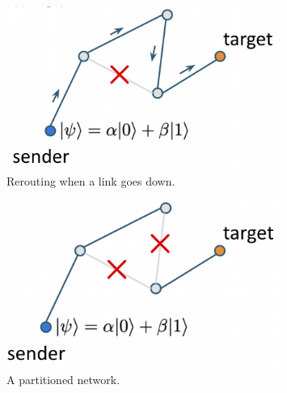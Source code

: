 \begin{figure}[H]
    \centering
    \includegraphics[width=0.8\textwidth]{lesson8/link-down.png}
        \caption{Rerouting when a link goes down.}
    \label{fig:link-down}
\end{figure}
\begin{figure}[H]
    \centering
    \includegraphics[width=0.8\textwidth]{lesson8/partitioned.png}
        \caption{A partitioned network.}
    \label{fig:partition}
\end{figure}


